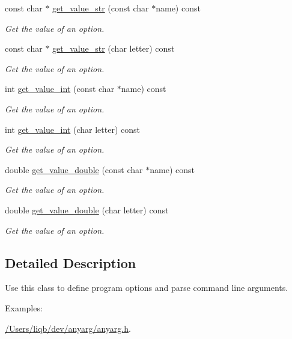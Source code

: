 {\bf }\par
\begin{DoxyCompactItemize}
\item 
const char $\ast$ \hyperlink{class_anyarg_a9788b24659c4b7ab69cfb8b1f55f1c15}{get\-\_\-value\-\_\-str} (const char $\ast$name) const 
\begin{DoxyCompactList}\small\item\em Get the value of an option. \end{DoxyCompactList}\item 
const char $\ast$ \hyperlink{class_anyarg_a8b5d891a9e146c17cd4d8038c5265fcc}{get\-\_\-value\-\_\-str} (char letter) const 
\begin{DoxyCompactList}\small\item\em Get the value of an option. \end{DoxyCompactList}\item 
int \hyperlink{class_anyarg_ae254a7571efbf058ad98fcd00a176470}{get\-\_\-value\-\_\-int} (const char $\ast$name) const 
\begin{DoxyCompactList}\small\item\em Get the value of an option. \end{DoxyCompactList}\item 
int \hyperlink{class_anyarg_a2c45edbcd6de87992c227c3994eb7e72}{get\-\_\-value\-\_\-int} (char letter) const 
\begin{DoxyCompactList}\small\item\em Get the value of an option. \end{DoxyCompactList}\item 
double \hyperlink{class_anyarg_a8d46bd713bb7bc5bd303e23afd5609d1}{get\-\_\-value\-\_\-double} (const char $\ast$name) const 
\begin{DoxyCompactList}\small\item\em Get the value of an option. \end{DoxyCompactList}\item 
double \hyperlink{class_anyarg_ad607e8d76b475ff3c5a9ccb4032258d7}{get\-\_\-value\-\_\-double} (char letter) const 
\begin{DoxyCompactList}\small\item\em Get the value of an option. \end{DoxyCompactList}\end{DoxyCompactItemize}



\subsection{Detailed Description}
Use this class to define program options and parse command line arguments. \begin{Desc}
\item[Examples\-: ]\par
\hyperlink{_2_users_2liqb_2dev_2anyarg_2anyarg_8h-example}{/\-Users/liqb/dev/anyarg/anyarg.\-h}.\end{Desc}


